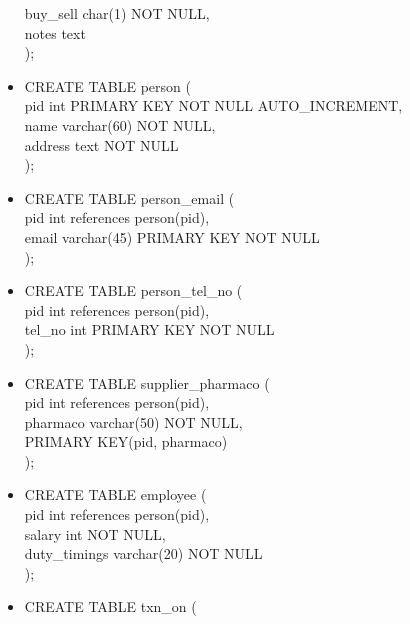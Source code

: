 \documentclass[a4papaer]{article}
\begin{document}
\begin{itemize}
			\hspace*{4mm}buy\_sell char(1) NOT NULL,\\
			\hspace*{4mm}notes text\\
		);
		\item CREATE TABLE person (\\
			\hspace*{4mm}pid int PRIMARY KEY NOT NULL AUTO\_INCREMENT,\\
			\hspace*{4mm}name varchar(60) NOT NULL,\\
			\hspace*{4mm}address text NOT NULL\\
		);
		\item CREATE TABLE person\_email (\\
			\hspace*{4mm}pid int references person(pid),\\
			\hspace*{4mm}email varchar(45) PRIMARY KEY NOT NULL\\
		);
		\item CREATE TABLE person\_tel\_no (\\
			\hspace*{4mm}pid int references person(pid),\\
			\hspace*{4mm}tel\_no int PRIMARY KEY NOT NULL\\
		);
		\item CREATE TABLE supplier\_pharmaco (\\
			\hspace*{4mm}pid int references person(pid),\\
			\hspace*{4mm}pharmaco varchar(50) NOT NULL,\\
			\hspace*{4mm}PRIMARY KEY(pid, pharmaco)\\
		);
		\item CREATE TABLE employee (\\
			\hspace*{4mm}pid int references person(pid),\\
			\hspace*{4mm}salary int NOT NULL,\\
			\hspace*{4mm}duty\_timings varchar(20) NOT NULL\\
		);
		\item CREATE TABLE txn\_on (\\

\end{itemize}
\end{document}
